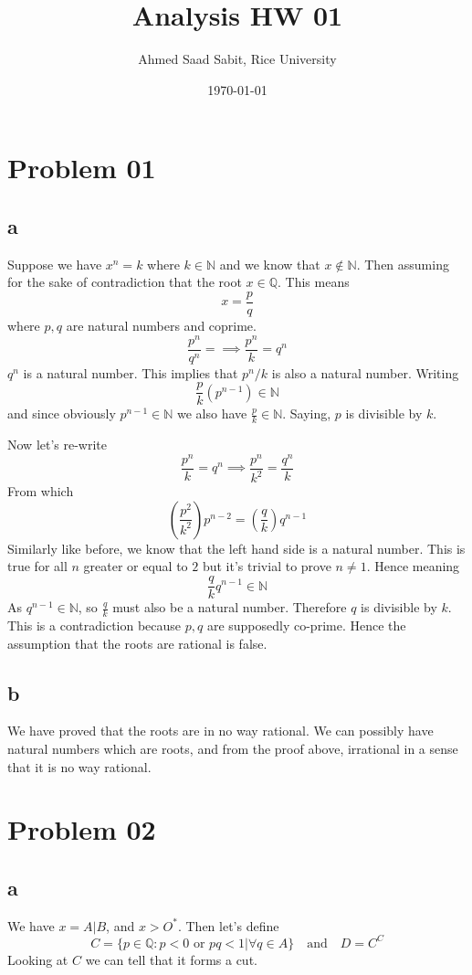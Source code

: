 \documentclass[letter, 12pt]{article}
\title{Analysis HW 01}
\author{Ahmed Saad Sabit, Rice University}
\date{\today}
\begin{document}
\selectfont
\maketitle

\tableofcontents


\newpage
\section{Problem 01} 
\subsection{a}
Suppose we have $x^{n} = k$ where $k \in \mathbb{N}$ and we know that $x \not\in \mathbb{N}$. Then assuming for the sake of contradiction that the root $x \in \mathbb{Q}$. This means 
\[
x = \frac{p}{q}
\] where $p,q$ are natural numbers and coprime. 
\[
\frac{p^{n}}{q^{n}} = \implies \frac{p^{n}}{k} = q^{n}
\] 
$q^{n}$ is a natural number. This implies that $p^{n}/k$ is also a natural number. Writing
\[
\frac{p}{k} (p ^{n-1}) \in \mathbb{N}
\] and since obviously $p^{n-1} \in \mathbb{N}$ we also have $\frac{p}{k} \in \mathbb{N}$. Saying, $p$ is divisible by $k$. 

Now let's re-write
\[
\frac{p^{n}}{k} = q^{n} \implies \frac{p^{n}}{k^2} = \frac{q^{n}}{k}
\] 
From which 
\[
	\left( \frac{p^2}{k^2}\right) p^{n-2} = \left(\frac{q}{k}\right)q^{n-1}
\] 
Similarly like before, we know that the left hand side is a natural number. This is true for all $n$ greater or equal to $2$ but it's trivial to prove $n \neq 1$. Hence meaning
\[
\frac{q}{k} q^{n-1} \in \mathbb{N}
\] 
As $q^{n-1} \in \mathbb{N}$, so $\frac{q}{k}$ must also be a natural number. Therefore $q$ is divisible by $k$. This is a contradiction because $p,q$ are supposedly co-prime. Hence the assumption that the roots are rational is false. 

\subsection{b} 
We have proved that the roots are in no way rational. We can possibly have natural numbers which are roots, and from the proof above, irrational in a sense that it is no way rational. 
\newpage
\section{Problem 02} 
\subsection{a}	
	We have $x = A | B$, and $x > O^{*}$. Then let's define 
	\[
		C = \{p \in \mathbb{Q}: p < 0 \text{ or } pq < 1 | \forall q \in A\} 
	\quad \text{and} \quad D = C^{C}
	\] 
	Looking at $C$ we can tell that it forms a cut. 
\end{document}
